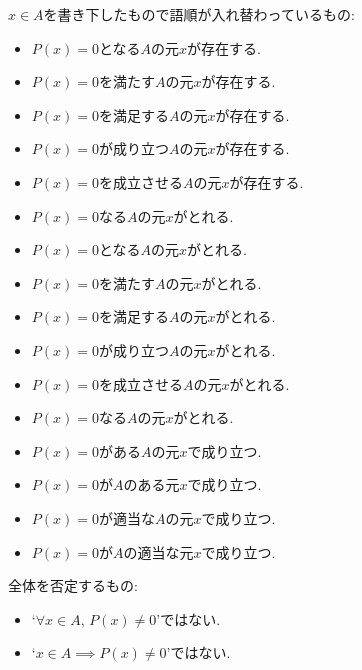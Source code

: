 \documentclass[a4paper,12pt,draft]{amsart}
\newcommand{\PPP}[1]{P(#1)=0}
\newcommand{\NotPPP}[1]{P(#1)\neq 0}
\begin{document}
$x\in A$を書き下したもので語順が入れ替わっているもの:
\begin{itemize}
\item $\PPP{x}$となる$A$の元$x$が存在する.
\item $\PPP{x}$を満たす$A$の元$x$が存在する.
\item $\PPP{x}$を満足する$A$の元$x$が存在する.
\item $\PPP{x}$が成り立つ$A$の元$x$が存在する.
\item $\PPP{x}$を成立させる$A$の元$x$が存在する.
\item $\PPP{x}$なる$A$の元$x$がとれる.
\item $\PPP{x}$となる$A$の元$x$がとれる.
\item $\PPP{x}$を満たす$A$の元$x$がとれる.
\item $\PPP{x}$を満足する$A$の元$x$がとれる.
\item $\PPP{x}$が成り立つ$A$の元$x$がとれる.
\item $\PPP{x}$を成立させる$A$の元$x$がとれる.
\item $\PPP{x}$なる$A$の元$x$がとれる.
\item $\PPP{x}$がある$A$の元$x$で成り立つ.
\item $\PPP{x}$が$A$のある元$x$で成り立つ.
\item $\PPP{x}$が適当な$A$の元$x$で成り立つ.
\item $\PPP{x}$が$A$の適当な元$x$で成り立つ.
\end{itemize}
全体を否定するもの:
\begin{itemize}
\item `$\forall x \in A$, $\NotPPP{x}$'ではない.
\item `$x \in A\implies \NotPPP{x}$'ではない.
\end{itemize}
\end{document}
